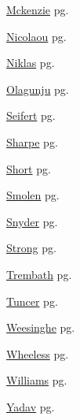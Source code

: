 \item \hyperlink{Mckenzie.1}{Mckenzie} pg. \pageref{abs:Mckenzie}
\item \hyperlink{Nicolaou.1}{Nicolaou} pg. \pageref{abs:Nicolaou}
\item \hyperlink{Niklas.1}{Niklas} pg. \pageref{abs:Niklas}
\item \hyperlink{Olagunju.1}{Olagunju} pg. \pageref{abs:Olagunju}
\item \hyperlink{Seifert.1}{Seifert} pg. \pageref{abs:Seifert}
\item \hyperlink{Sharpe.1}{Sharpe} pg. \pageref{abs:Sharpe}
\item \hyperlink{Short.1}{Short} pg. \pageref{abs:Short}
\item \hyperlink{Smolen.1}{Smolen} pg. \pageref{abs:Smolen}
\item \hyperlink{Snyder.1}{Snyder} pg. \pageref{abs:Snyder}
\item \hyperlink{Strong.1}{Strong} pg. \pageref{abs:Strong}
\item \hyperlink{Trembath.1}{Trembath} pg. \pageref{abs:Trembath}
\item \hyperlink{Tuncer.1}{Tuncer} pg. \pageref{abs:Tuncer}
\item \hyperlink{Weesinghe.1}{Weesinghe} pg. \pageref{abs:Weesinghe}
\item \hyperlink{Wheeless.1}{Wheeless} pg. \pageref{abs:Wheeless}
\item \hyperlink{Williams.1}{Williams} pg. \pageref{abs:Williams}
\item \hyperlink{Yadav.1}{Yadav} pg. \pageref{abs:Yadav}
